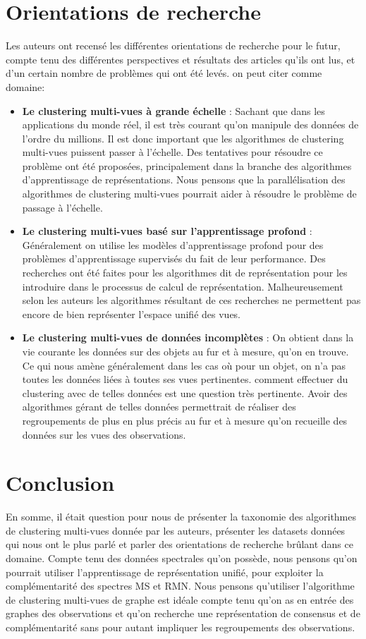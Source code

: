 \documentclass[12pt, french, latin.medieval, a4paper]{report}
\begin{document}
	\section{Orientations de recherche}
	Les auteurs ont recensé les différentes orientations de recherche pour le futur, compte tenu des différentes perspectives et résultats des articles qu'ils ont lus, et d'un certain nombre de problèmes qui ont été levés. on peut citer comme domaine:
	\begin{itemize}
    	\item \textbf{Le clustering multi-vues à grande échelle} : Sachant que dans les applications du monde réel, il est très courant qu'on manipule des données de l'ordre du millions. Il est donc important que les algorithmes de clustering multi-vues puissent passer à l'échelle. Des tentatives pour résoudre ce problème ont été proposées, principalement dans la branche des algorithmes d’apprentissage de représentations. Nous pensons que la parallélisation des algorithmes de clustering multi-vues pourrait aider à résoudre le problème de passage à l’échelle.
    	\item \textbf{Le clustering multi-vues basé sur l'apprentissage profond} : Généralement on utilise les modèles d'apprentissage profond pour des problèmes d'apprentissage supervisés du fait de leur performance. Des recherches ont été faites pour les algorithmes dit de représentation pour les introduire dans le processus de calcul de représentation. Malheureusement selon les auteurs les algorithmes résultant de ces recherches ne permettent pas encore de bien représenter l’espace unifié des vues.

    	\item \textbf{Le clustering multi-vues de données incomplètes} : On obtient dans la vie courante les données sur des objets au fur et à mesure, qu’on en trouve. Ce qui nous amène généralement dans les cas où pour un objet, on n'a pas toutes les données liées à toutes ses vues pertinentes. comment effectuer du clustering avec de telles données est une question très pertinente. Avoir des algorithmes gérant de telles données permettrait de réaliser des regroupements de plus en plus précis au fur et à mesure qu'on recueille des données sur les vues des observations.
	\end{itemize}

	\section{Conclusion}
	En somme, il était question pour nous de présenter la taxonomie des algorithmes de clustering multi-vues donnée par les auteurs, présenter les datasets données qui nous ont le plus parlé et parler des orientations de recherche brûlant dans ce domaine. Compte tenu des données spectrales qu'on possède, nous pensons qu'on pourrait utiliser l'apprentissage de représentation unifié, pour exploiter la complémentarité des spectres MS et RMN. Nous pensons qu'utiliser l'algorithme de clustering multi-vues de graphe est idéale compte tenu qu'on as en entrée des graphes des observations et qu'on recherche une représentation de consensus et de complémentarité sans pour autant impliquer les regroupements des observations.

   

    
\end{document}
